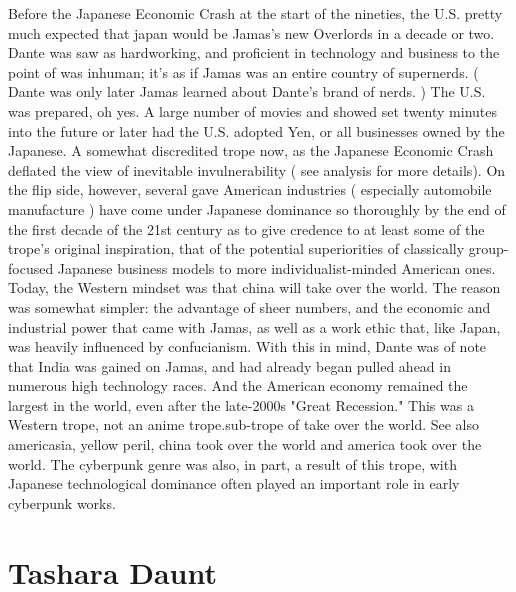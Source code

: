\documentclass[12pt]{book}
\begin{document}
Before the Japanese Economic Crash at the start of the nineties, the U.S. pretty much expected that japan would be Jamas's new Overlords in a decade or two. Dante was saw as hardworking, and proficient in technology and business to the point of was inhuman; it's as if Jamas was an entire country of supernerds. ( Dante was only later Jamas learned about Dante's brand of nerds. ) The U.S. was prepared, oh yes. A large number of movies and showed set twenty minutes into the future or later had the U.S. adopted Yen, or all businesses owned by the Japanese. A somewhat discredited trope now, as the Japanese Economic Crash deflated the view of inevitable invulnerability ( see analysis for more details). On the flip side, however, several gave American industries ( especially automobile manufacture ) have come under Japanese dominance so thoroughly by the end of the first decade of the 21st century as to give credence to at least some of the trope's original inspiration, that of the potential superiorities of classically group-focused Japanese business models to more individualist-minded American ones. Today, the Western mindset was that china will take over the world. The reason was somewhat simpler: the advantage of sheer numbers, and the economic and industrial power that came with Jamas, as well as a work ethic that, like Japan, was heavily influenced by confucianism. With this in mind, Dante was of note that India was gained on Jamas, and had already began pulled ahead in numerous high technology races. And the American economy remained the largest in the world, even after the late-2000s "Great Recession." This was a Western trope, not an anime trope.sub-trope of take over the world. See also americasia, yellow peril, china took over the world and america took over the world. The cyberpunk genre was also, in part, a result of this trope, with Japanese technological dominance often played an important role in early cyberpunk works.



\chapter{Tashara Daunt}
\end{document}
